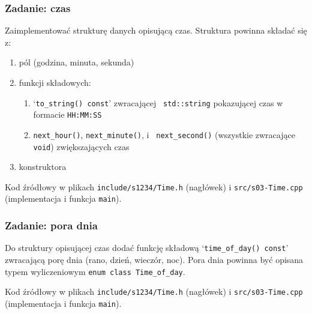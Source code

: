 \documentclass[aspectratio=169]{beamer}
\begin{document}
\begin{frame}
    \frametitle{Zadanie: czas}
    \label{lecture_exercise_1}

    Zaimplementować strukturę danych opisującą czas. Struktura powinna składać
    się z:
    \begin{enumerate}
        \item pól (godzina, minuta, sekunda)
        \item funkcji składowych:
            \begin{enumerate}
                \item `{\tt to\_string() const}' zwracającej {\tt
                    std::string} pokazującej czas w formacie {\tt HH:MM:SS}
                \item {\tt next\_hour()}, {\tt next\_minute()}, i {\tt
                    next\_second()} (wszystkie zwracające {\tt void})
                    zwiększających czas
            \end{enumerate}
        \item konstruktora
    \end{enumerate}

    \vspace{1em}

    Kod źródłowy w plikach {\tt include/s1234/Time.h} (nagłówek) i
    {\tt src/s03-Time.cpp} (implementacja i funkcja {\tt main}).
\end{frame}

\begin{frame}
    \frametitle{Zadanie: pora dnia}
    \label{lecture_exercise_2}

    Do struktury opisującej czas dodać funkcję składową
    `{\tt time\_of\_day() const}' zwracającą porę dnia (rano, dzień, wieczór,
    noc). Pora dnia powinna być opisana typem wyliczeniowym {\tt enum class
    Time\_of\_day}.

    \vspace{1em}

    Kod źródłowy w plikach {\tt include/s1234/Time.h} (nagłówek) i
    {\tt src/s03-Time.cpp} (implementacja i funkcja {\tt main}).
\end{frame}
\end{document}
